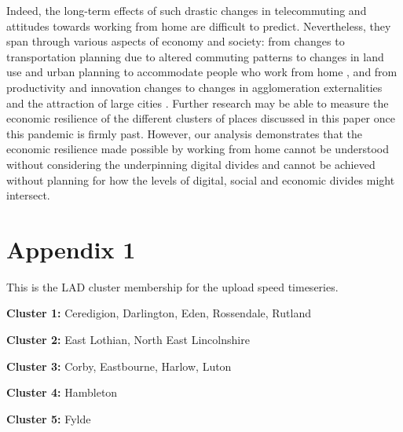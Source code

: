 \documentclass[Royal,times,sageh]{sagej}
\begin{document}
Indeed, the long-term effects of such drastic changes in telecommuting
and attitudes towards working from home are difficult to predict.
Nevertheless, they span through various aspects of economy and society:
from changes to transportation planning due to altered commuting
patterns to changes in land use and urban planning to accommodate people
who work from home \citep{BUDNITZ2020102713, ELLDER2020102777}, and from
productivity and innovation changes to changes in agglomeration
externalities and the attraction of large cities \citep{econobs}.
Further research may be able to measure the economic resilience of the
different clusters of places discussed in this paper once this pandemic
is firmly past. However, our analysis demonstrates that the economic
resilience made possible by working from home cannot be understood
without considering the underpinning digital divides and cannot be
achieved without planning for how the levels of digital, social and
economic divides might intersect.

\hypertarget{appendix1}{%
\section{Appendix 1}\label{appendix1}}

This is the LAD cluster membership for the upload speed timeseries.

\textbf{Cluster 1: } Ceredigion, Darlington, Eden, Rossendale, Rutland

\textbf{Cluster 2: } East Lothian, North East Lincolnshire

\textbf{Cluster 3: } Corby, Eastbourne, Harlow, Luton

\textbf{Cluster 4: } Hambleton

\textbf{Cluster 5: } Fylde
\end{document}
